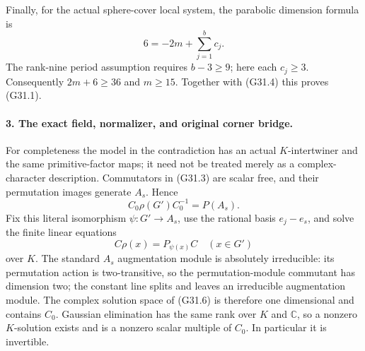 Finally, for the actual sphere-cover local system, the parabolic
dimension formula is
\[
                  6=-2m+\sum_{j=1}^{b}c_j.
\]
The rank-nine period assumption requires $b-3\ge9$; here each
$c_j\ge3$.  Consequently $2m+6\ge36$ and $m\ge15$.
Together with (G31.4) this proves (G31.1).

\paragraph{3. The exact field, normalizer, and original corner bridge.}
For completeness the model in the contradiction has an actual
$K$-intertwiner and the same primitive-factor maps; it need not
be treated merely as a complex-character description.  Commutators
in (G31.3) are scalar free, and their permutation images generate
$A_s$.  Hence
\[
                 C_0\rho(G')C_0^{-1}=P(A_s).                \tag{G31.5}
\]
Fix this literal isomorphism $\psi:G'\to A_s$, use the rational
basis $e_j-e_s$, and solve the finite linear equations
\[
                  C\rho(x)=P_{\psi(x)}C\quad(x\in G')      \tag{G31.6}
\]
over $K$.  The standard $A_s$ augmentation module is absolutely
irreducible: its permutation action is two-transitive, so the
permutation-module commutant has dimension two; the constant
line splits and leaves an irreducible augmentation module.
The complex solution space of (G31.6) is therefore one dimensional
and contains $C_0$.  Gaussian elimination has the same rank over
$K$ and $\mathbb C$, so a nonzero $K$-solution exists and is a
nonzero scalar multiple of $C_0$.  In particular it is invertible.

